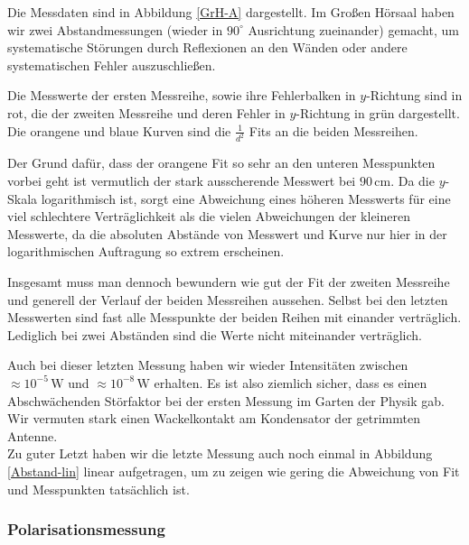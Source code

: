 \documentclass[titlepage,11pt,a4paper,ngerman]{article}
\newcommand{\tx}[1]{\textrm{#1}}
\begin{document}
Die Messdaten sind in Abbildung \ref{GrH-A} dargestellt. Im Großen Hörsaal haben wir zwei Abstandmessungen (wieder in $ 90^\circ $ Ausrichtung zueinander) gemacht, um systematische Störungen durch Reflexionen an den Wänden oder andere systematischen Fehler auszuschließen.\par
Die Messwerte der ersten Messreihe, sowie ihre Fehlerbalken in $ y $-Richtung sind in rot, die der zweiten Messreihe und deren Fehler in $ y $-Richtung in grün dargestellt. Die orangene und blaue Kurven sind die $ \frac{1}{d^2} $ Fits an die beiden Messreihen.\par
Der Grund dafür, dass der orangene Fit so sehr an den unteren Messpunkten vorbei geht ist vermutlich der stark ausscherende Messwert bei $ 90 \, \tx{cm} $. Da die $ y $-Skala logarithmisch ist, sorgt eine Abweichung eines höheren Messwerts für eine viel schlechtere Verträglichkeit als die vielen Abweichungen der kleineren Messwerte, da die absoluten Abstände von Messwert und Kurve nur hier in der logarithmischen Auftragung so extrem erscheinen.\par
Insgesamt muss man dennoch bewundern wie gut der Fit der zweiten Messreihe und generell der Verlauf der beiden Messreihen aussehen. Selbst bei den letzten Messwerten sind fast alle Messpunkte der beiden Reihen mit einander verträglich. Lediglich bei zwei Abständen sind die Werte nicht miteinander verträglich.\par
Auch bei dieser letzten Messung haben wir wieder Intensitäten zwischen $ \approx 10^{-5} \, \tx{W} $ und $ \approx 10^{-8} \, \tx{W} $ erhalten. Es ist also ziemlich sicher, dass es einen Abschwächenden Störfaktor bei der ersten Messung im Garten der Physik gab. Wir vermuten stark einen Wackelkontakt am Kondensator der getrimmten Antenne.\\[10pt]
\noindent
Zu guter Letzt haben wir die letzte Messung auch noch einmal in Abbildung \ref{Abstand-lin} linear aufgetragen, um zu zeigen wie gering die Abweichung von Fit und Messpunkten tatsächlich ist.

\subsubsection{Polarisationsmessung}
\end{document}
